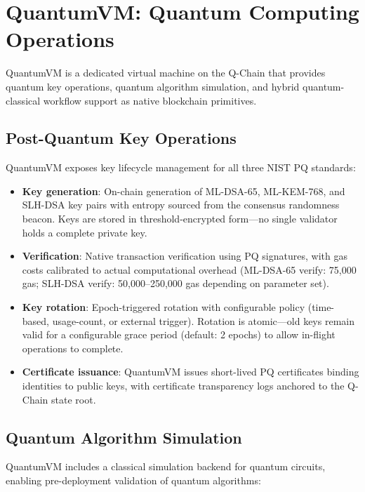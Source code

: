 \documentclass[11pt,letterpaper]{article}
\begin{document}
\section{QuantumVM: Quantum Computing Operations}

QuantumVM is a dedicated virtual machine on the Q-Chain that provides quantum key operations, quantum algorithm simulation, and hybrid quantum-classical workflow support as native blockchain primitives.

\subsection{Post-Quantum Key Operations}

QuantumVM exposes key lifecycle management for all three NIST PQ standards:

\begin{itemize}
\item \textbf{Key generation}: On-chain generation of ML-DSA-65, ML-KEM-768, and SLH-DSA key pairs with entropy sourced from the consensus randomness beacon. Keys are stored in threshold-encrypted form---no single validator holds a complete private key.
\item \textbf{Verification}: Native transaction verification using PQ signatures, with gas costs calibrated to actual computational overhead (ML-DSA-65 verify: 75,000 gas; SLH-DSA verify: 50,000--250,000 gas depending on parameter set).
\item \textbf{Key rotation}: Epoch-triggered rotation with configurable policy (time-based, usage-count, or external trigger). Rotation is atomic---old keys remain valid for a configurable grace period (default: 2 epochs) to allow in-flight operations to complete.
\item \textbf{Certificate issuance}: QuantumVM issues short-lived PQ certificates binding identities to public keys, with certificate transparency logs anchored to the Q-Chain state root.
\end{itemize}

\subsection{Quantum Algorithm Simulation}

QuantumVM includes a classical simulation backend for quantum circuits, enabling pre-deployment validation of quantum algorithms:
\end{document}

